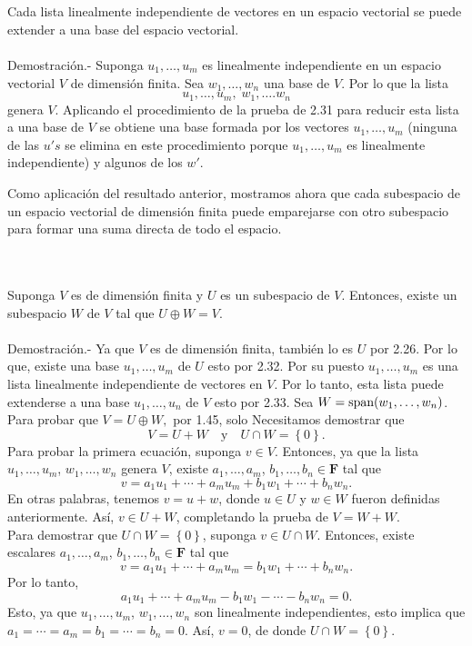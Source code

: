 \setcounter{myteo}{32}
\begin{myteo}\,\\\\
    Cada lista linealmente independiente de vectores en un espacio vectorial se puede extender a una base del espacio vectorial.\\\\
	Demostración.-\; Suponga $u_1,\ldots,u_m$ es linealmente independiente en un espacio vectorial $V$ de dimensión finita. Sea $w_1,\ldots,w_n$ una base de $V$. Por lo que la lista
	$$u_1,\ldots,u_m,\; w_1,\ldots.w_n$$
	genera $V$. Aplicando el procedimiento de la prueba de 2.31 para reducir esta lista a una base de $V$ se obtiene una base formada por los vectores $u_1, \ldots , u_m$ (ninguna de las $u's$ se elimina en este procedimiento porque $u_1,\ldots, u_m$ es linealmente independiente) y algunos de los $w'$.
\end{myteo}

Como aplicación del resultado anterior, mostramos ahora que cada subespacio de un espacio vectorial de dimensión finita puede emparejarse con otro subespacio para formar una suma directa de todo el espacio.

\begin{myteo}\;\\\\
    Suponga $V$ es de dimensión finita y $U$ es un subespacio de $V$. Entonces, existe un subespacio $W$ de $V$ tal que $U\oplus W=V$.\\\\
	Demostración.-\; Ya que $V$ es de dimensión finita, también lo es $U$ por 2.26. Por lo que, existe una base $u_1,\ldots,u_m$ de $U$ esto por 2.32. Por su puesto $u_1,\ldots,u_m$ es una lista linealmente independiente de vectores en $V$. Por lo tanto, esta lista puede extenderse a una base $u_1,\ldots,u_n$ de $V$ esto por 2.33. Sea $W=\mathop{\mbox{\normalfont span}}\nolimits(w_1,\ldots,w_n)$. Para probar que $V=U\oplus W,$ por 1.45, solo Necesitamos demostrar que
	$$V=U+W \quad \mbox{y}\quad U\cap W=\left\{0\right\}.$$
	Para probar la primera ecuación, suponga $v\in V$. Entonces, ya que la lista $u_1,\ldots,u_m$, $w_1,\ldots,w_n$ genera $V$, existe $a_1,\ldots,a_m$, $b_1,\ldots,b_n\in \textbf{F}$ tal que
	$$v=a_1u_1+\cdots+a_mu_m+b_1w_1+\cdots+b_nw_n.$$
	En otras palabras, tenemos $v=u+w$, donde $u\in U$ y $w\in W$ fueron definidas anteriormente. Así, $v\in U+W$, completando la prueba de $V=W+W$.\\
	Para demostrar que $U\cap W=\left\{0\right\}$, suponga $v\in U\cap W$. Entonces, existe escalares $a_1,\ldots,a_m$, $b_1,\ldots,b_n\in \textbf{F}$ tal que
	$$v=a_1u_1+\cdots+a_mu_m=b_1w_1+\cdots+b_nw_n.$$
	Por lo tanto,
	$$a_1u_1+\cdots+a_mu_m-b_1w_1-\cdots-b_nw_n=0.$$
	Esto, ya que $u_1,\ldots,u_m$, $w_1,\ldots,w_n$ son linealmente independientes, esto implica que $a_1=\cdots=a_m=b_1=\cdots=b_n=0$. Así, $v=0$, de donde $U\cap W= \left\{0\right\}$.
\end{myteo}

